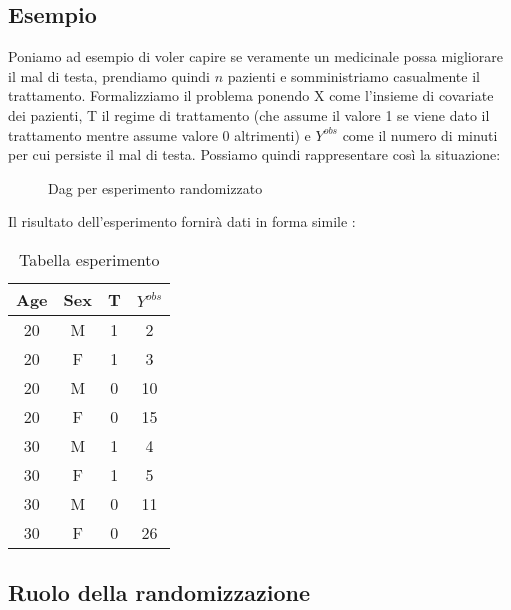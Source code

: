 \documentclass{article}
\begin{document}
\subsection{Esempio}
Poniamo ad esempio di voler capire se veramente un medicinale possa migliorare il mal di testa, prendiamo quindi $n$ pazienti e somministriamo casualmente il trattamento. Formalizziamo il problema ponendo X come l'insieme di covariate dei pazienti, T il regime di trattamento (che assume il valore 1 se viene dato il trattamento mentre assume valore 0 altrimenti) e $Y^{obs}$ come il numero di minuti per cui persiste il mal di testa. Possiamo quindi rappresentare così la situazione:

\begin{figure}[!h]
\centering
\caption{Dag per esperimento randomizzato}
\label{fig:dag_random_EX}
\end{figure}

Il risultato dell'esperimento fornirà dati in forma simile : 
\begin{table}[H]
\centering
\begin{tabular}{|c|c|c|c|}
\hline
Age & Sex & T & $Y^{obs}$\\ \hline
20 & M & 1 & 2  \\ \hline
20 & F & 1 & 3 \\ \hline
20 & M & 0 & 10  \\ \hline
20 & F & 0 & 15 \\ \hline
30 & M & 1 & 4  \\ \hline
30 & F & 1 & 5 \\ \hline
30 & M & 0 & 11  \\ \hline
30 & F & 0 & 26 \\ \hline
\end{tabular}
\caption{Tabella esperimento }
\end{table}





\subsection{Ruolo della randomizzazione}












\nocite{*} 
\end{document}
